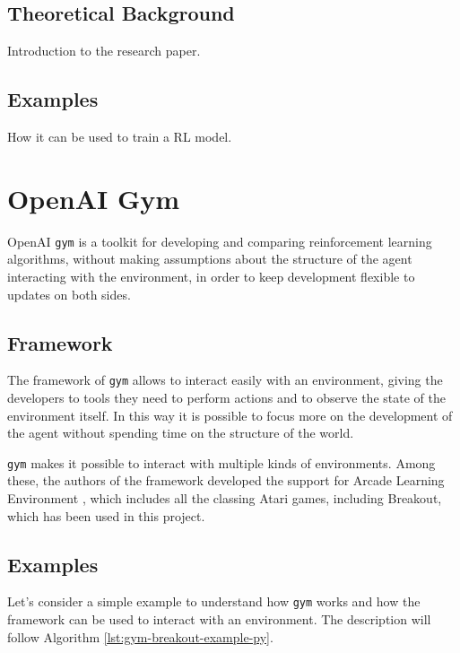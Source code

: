 \documentclass[a4paper]{article}
\begin{document}
\subsection{Theoretical Background}
Introduction to the research paper.

\subsection{Examples}
How it can be used to train a RL model.

\clearpage
\section{OpenAI Gym}
OpenAI \texttt{gym} \cite{1606.01540} is a toolkit for developing and comparing
reinforcement learning algorithms, without making assumptions about the
structure of the agent interacting with the environment, in order to
keep development flexible to updates on both sides.

\subsection{Framework}
The framework of \texttt{gym} allows to interact easily
with an environment, giving the developers to tools they need to perform
actions and to observe the state of the environment itself. In this way it is
possible to focus more on the development of the agent without spending
time on the structure of the world.

\texttt{gym} makes it possible to interact with multiple kinds of environments.
Among these, the authors of the framework developed the support for
Arcade Learning Environment \cite{bellemare13arcade}, which includes all the
classing Atari games, including Breakout, which has been used in this project.

\subsection{Examples}
Let's consider a simple example to understand how \texttt{gym} works and
how the framework can be used to interact with an environment.
The description will follow Algorithm \ref{lst:gym-breakout-example-py}.


\end{document}
